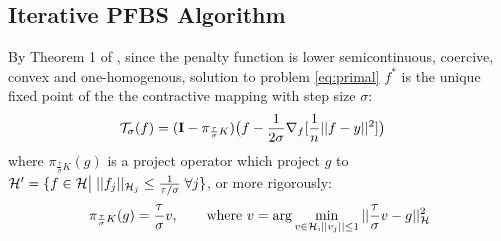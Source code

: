 \documentclass[tablecaption=bottom,wcp]{jmlr} %
\begin{document}
\subsection{Iterative PFBS Algorithm} \label{sec:PFBS}
By Theorem 1 of \citet{rosasco-prox-2009}, since the penalty function is lower semicontinuous, coercive, convex and one-homogenous,   solution to problem \ref{eq:primal} $f^*$ is the unique fixed point of the the contractive mapping with step size $\sigma$:
\begin{align*}
{\cal T}_\sigma(f) &= ({\bf I} - \pi_{\frac{\tau}{\sigma}K}) 
\big(f - \frac{1}{2\sigma} 
\nabla_f [ \frac{1}{n}||f - y||^2 ] \big)
\end{align*}
where $\pi_{\frac{\tau}{\sigma}K}(g)$ is a project operator which project $g$ to ${\cal H}' = \{f \in {\cal H} \big|\;   ||f_j||_{{\cal H}_j} \leq \frac{1}{\tau/\sigma} \; \forall j \}$, or more rigorously:
$$ \pi_{\frac{\tau}{\sigma}K}(g) = \frac{\tau}{\sigma} v, \qquad \mbox{where } v = \arg\min_{v\in {\cal H}, ||v_j||\leq 1} ||\frac{\tau}{\sigma}v - g||_{\cal H}^2$$
\end{document}
